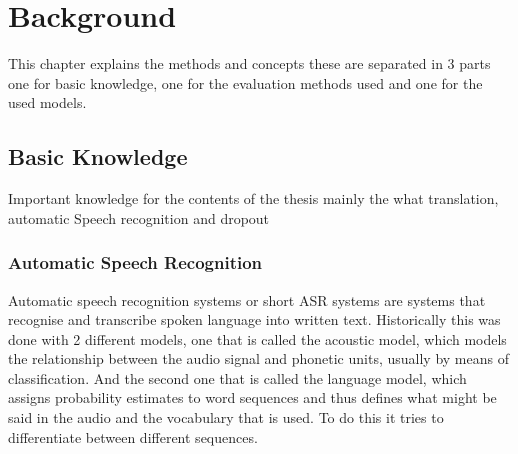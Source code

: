 \chapter{Background}
\label{ch:background}
This chapter explains the methods and concepts these are separated in 3 parts one for basic knowledge, one for the evaluation methods used and one for the used models. 

\section{Basic Knowledge}
Important knowledge for the contents of the thesis mainly the what translation, automatic Speech recognition and dropout

\subsection{Automatic Speech Recognition}
Automatic speech recognition systems or short ASR systems are systems that recognise and transcribe spoken language into written text.
Historically this was done with 2 different models, one that is called the acoustic model, which models the relationship between the audio signal and phonetic units, usually by means of classification. 
And the second one that is called the language model, which assigns probability estimates to word sequences and thus defines what might be said in the audio and the vocabulary that is used.  
To do this it tries to differentiate between different sequences. \cite{understandingasr}

